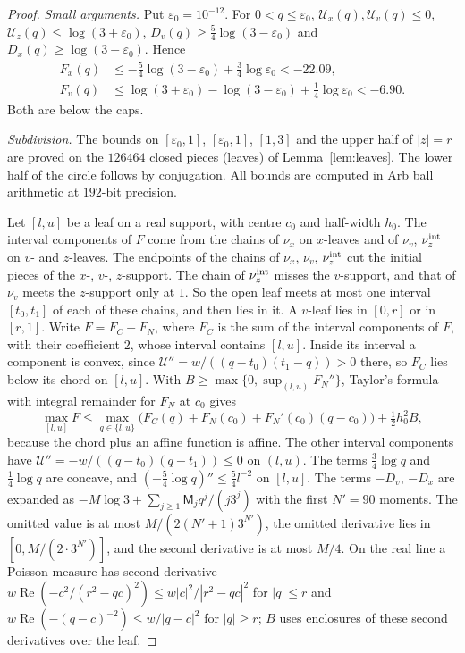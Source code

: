 \documentclass{amsart}
\numberwithin{equation}{section}
\numberwithin{table}{section}
\newcommand{\nleaves}{126464}
\newcommand{\NF}{90}
\newcommand{\precF}{192}
\begin{document}
\begin{proof}
\emph{Small arguments.} Put $\varepsilon_0=10^{-12}$. For $0<q\le\varepsilon_0$,
$\mathcal U_x(q),\mathcal U_v(q)\le0$, $\mathcal U_z(q)\le\log(3+\varepsilon_0)$,
$D_v(q)\ge\frac54\log(3-\varepsilon_0)$ and $D_x(q)\ge\log(3-\varepsilon_0)$. Hence
\begin{align*}
 F_x(q)&\le-\tfrac54\log(3-\varepsilon_0)+\tfrac34\log\varepsilon_0<-22.09,\\
 F_v(q)&\le\log(3+\varepsilon_0)-\log(3-\varepsilon_0)+\tfrac14\log\varepsilon_0<-6.90.
\end{align*}
Both are below the caps.

\emph{Subdivision.} The bounds on $[\varepsilon_0,1]$, $[\varepsilon_0,1]$,
$[1,3]$ and the upper half of $|z|=r$ are proved on the $\nleaves$ closed
pieces (leaves) of Lemma~\ref{lem:leaves}. The lower half of the circle
follows by conjugation. All bounds are computed in Arb ball arithmetic
\cite{Arb} at $\precF$-bit precision.

Let $[l,u]$ be a leaf on a real support, with centre $c_0$ and half-width
$h_0$. The interval components of $F$ come from the chains of $\nu_x$ on
$x$-leaves and of $\nu_v$, $\nu_z^{\rm int}$ on $v$- and $z$-leaves. The
endpoints of the chains of $\nu_x$, $\nu_v$, $\nu_z^{\rm int}$ cut the
initial pieces of the $x$-, $v$-, $z$-support. The chain of $\nu_z^{\rm int}$
misses the $v$-support, and that of $\nu_v$ meets the $z$-support only at
$1$. So the open leaf
meets at most one interval $[t_0,t_1]$ of each of these chains, and then lies
in it. A $v$-leaf lies in $[0,r]$ or in $[r,1]$.
Write $F=F_C+F_N$, where $F_C$ is the sum of the interval components of $F$,
with their coefficient $2$, whose interval contains $[l,u]$. Inside its
interval a component is convex, since $\mathcal U''=w/((q-t_0)(t_1-q))>0$
there, so $F_C$ lies below its chord on $[l,u]$. With
$B\ge\max\{0,\sup_{(l,u)}F_N''\}$, Taylor's formula with integral remainder
for $F_N$ at $c_0$ gives
\[
 \max_{[l,u]}F\le\max_{q\in\{l,u\}}\bigl(F_C(q)+F_N(c_0)+F_N'(c_0)(q-c_0)\bigr)
 +\tfrac12h_0^2B,
\]
because the chord plus an affine function is affine. The other interval
components have $\mathcal U''=-w/((q-t_0)(q-t_1))\le0$ on $(l,u)$. The terms
$\frac34\log q$ and $\frac14\log q$ are concave, and
$(-\frac54\log q)''\le\frac54l^{-2}$ on $[l,u]$. The terms $-D_v$, $-D_x$
are expanded as $-M\log3+\sum_{j\ge1}\mathsf M_jq^j/(j3^j)$ with the first
$N'=\NF$ moments. The omitted value is at most $M/(2(N'+1)3^{N'})$, the
omitted derivative lies in $[0,M/(2\cdot3^{N'})]$, and the second
derivative is at most $M/4$. On the real line a Poisson measure has second
derivative $w\operatorname{Re}(-\overline c^2/(r^2-q\overline c)^2)
\le w|c|^2/|r^2-q\overline c|^2$ for $|q|\le r$ and
$w\operatorname{Re}(-(q-c)^{-2})\le w/|q-c|^2$ for $|q|\ge r$; $B$ uses
enclosures of these second derivatives over the leaf.


\end{proof}
\end{document}
